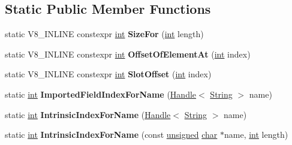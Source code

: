 \subsection*{Static Public Member Functions}
\begin{DoxyCompactItemize}
\item 
\mbox{\label{classv8_1_1internal_1_1Context_a641730ca0015de1eb8641dd9ec69a5b1}} 
static V8\+\_\+\+I\+N\+L\+I\+NE constexpr \mbox{\hyperlink{classint}{int}} {\bfseries Size\+For} (\mbox{\hyperlink{classint}{int}} length)
\item 
\mbox{\label{classv8_1_1internal_1_1Context_a536b4f3c727205a1f1760d2bd4e4633d}} 
static V8\+\_\+\+I\+N\+L\+I\+NE constexpr \mbox{\hyperlink{classint}{int}} {\bfseries Offset\+Of\+Element\+At} (\mbox{\hyperlink{classint}{int}} index)
\item 
\mbox{\label{classv8_1_1internal_1_1Context_a9829676d356f98ca57acd483d7f5f927}} 
static V8\+\_\+\+I\+N\+L\+I\+NE constexpr \mbox{\hyperlink{classint}{int}} {\bfseries Slot\+Offset} (\mbox{\hyperlink{classint}{int}} index)
\item 
\mbox{\label{classv8_1_1internal_1_1Context_aac21aeb693f1cca1783460a4515cdb7d}} 
static \mbox{\hyperlink{classint}{int}} {\bfseries Imported\+Field\+Index\+For\+Name} (\mbox{\hyperlink{classv8_1_1internal_1_1Handle}{Handle}}$<$ \mbox{\hyperlink{classv8_1_1internal_1_1String}{String}} $>$ name)
\item 
\mbox{\label{classv8_1_1internal_1_1Context_aee0b0ded909f741a2167a59109656d28}} 
static \mbox{\hyperlink{classint}{int}} {\bfseries Intrinsic\+Index\+For\+Name} (\mbox{\hyperlink{classv8_1_1internal_1_1Handle}{Handle}}$<$ \mbox{\hyperlink{classv8_1_1internal_1_1String}{String}} $>$ name)
\item 
\mbox{\label{classv8_1_1internal_1_1Context_ae3c29589ce27d6dd4e008ebfdb092d00}} 
static \mbox{\hyperlink{classint}{int}} {\bfseries Intrinsic\+Index\+For\+Name} (const \mbox{\hyperlink{classunsigned}{unsigned}} \mbox{\hyperlink{classchar}{char}} $\ast$name, \mbox{\hyperlink{classint}{int}} length)
\item 

\end{DoxyCompactItemize}
